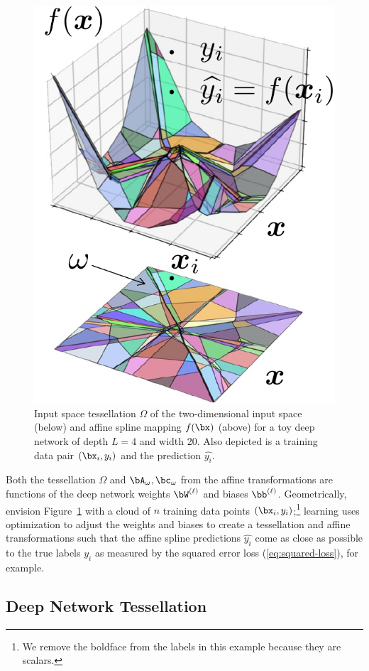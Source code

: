 \documentclass{notices}
\begin{document}
\begin{figure}[h]
    \centering
\includegraphics[width=0.8\linewidth]{Figs/tiling4.pdf}
    \caption{\small
    Input space tessellation $\Omega$ of the two-dimensional input space (below) and affine spline mapping $f(\bx)$ (above) for a toy deep network of depth $L=4$ and width 20.
    Also depicted is a training data pair $(\bx_i,y_i)$ and the prediction $\widehat{y_i}$.}
    \label{fig:CPA2D}
\end{figure}


Both the tessellation $\Omega$ and 
$\bA_{\omega},\bc_{\omega}$ from the affine transformations are functions of the deep network weights $\bW^{(\ell)}$ and biases $\bb^{(\ell)}$.
Geometrically, envision Figure~\ref{fig:CPA2D} with a cloud of $n$ training data points $(\bx_i,y_i)$;\footnote
{We remove the boldface from the labels in this example because they are scalars.} 
learning uses optimization to adjust the weights and biases to create a tessellation and affine transformations such that the affine spline predictions $\widehat{y_i}$ come as close as possible to the true labels $y_i$ as measured by the squared error loss (\ref{eq:squared-loss}), for example. 




\subsection*{Deep Network Tessellation}
\end{document}
